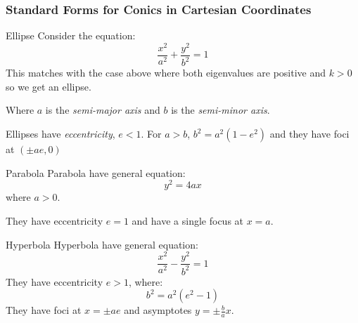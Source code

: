 \documentclass[../main.tex]{subfiles}
\begin{document}
\subsubsection{Standard Forms for Conics in Cartesian Coordinates}
\begin{proofcases}
  \begin{case}{Ellipse}
    Consider the equation:
    \[
      \frac{x^2}{a^2} + \frac{y^2}{b^2} = 1
    \]
    This matches with the case above where both eigenvalues are positive and $k > 0$ so we get an ellipse.
    \begin{center}
    \end{center}
    Where $a$ is the \textit{semi-major axis} and $b$ is the \textit{semi-minor axis}.

    Ellipses have \textit{eccentricity}, $e < 1$.
    For $a > b$, $b^2 = a^2(1 - e^2)$ and they have foci at $(\pm ae, 0)$
  \end{case}
  \begin{case}{Parabola}
    Parabola have general equation:
    \[
      y^2 = 4ax
    \]
    where $a > 0$.

    They have eccentricity $e = 1$ and have a single focus at $x = a$.

    \begin{center}
    \end{center}
  \end{case}
  \begin{case}{Hyperbola}
    Hyperbola have general equation:
    \[
      \frac{x^2}{a^2} - \frac{y^2}{b^2} = 1
    \]
    They have eccentricity $e > 1$, where:
    \[
      b^2 = a^2(e^2 - 1)
    \]
    They have foci at $x = \pm ae$ and asymptotes $y = \pm \frac{b}{a}x$.


\end{case}
\end{proofcases}
\end{document}
